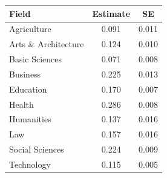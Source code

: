 \begin{tabular}{lcc}
\toprule
Field & Estimate & SE \\
\midrule
Agriculture & 0.091 & 0.011 \\
Arts \& Architecture & 0.124 & 0.010 \\
Basic Sciences & 0.071 & 0.008 \\
Business & 0.225 & 0.013 \\
Education & 0.170 & 0.007 \\
Health & 0.286 & 0.008 \\
Humanities & 0.137 & 0.016 \\
Law & 0.157 & 0.016 \\
Social Sciences & 0.224 & 0.009 \\
Technology & 0.115 & 0.005 \\
\bottomrule
\end{tabular}
